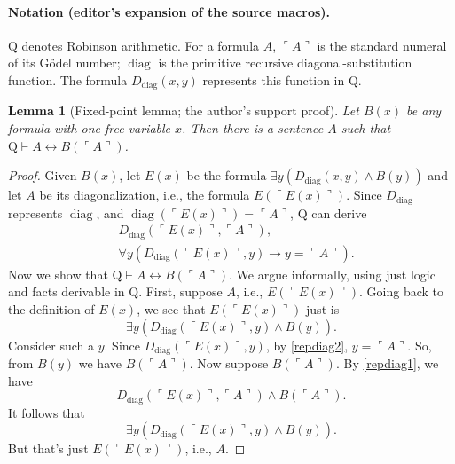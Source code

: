 \documentclass[UTF8,11pt]{ctexart}
\newtheorem*{lemma}{Lemma}
\theoremstyle{definition}
\begin{document}
\paragraph{Notation (editor's expansion of the source macros).}
$\mathrm Q$ denotes Robinson arithmetic. For a formula $A$, $\ulcorner A\urcorner$ is the standard numeral of its G\"odel number; $\operatorname{diag}$ is the primitive recursive diagonal-substitution function. The formula $D_{\operatorname{diag}}(x,y)$ represents this function in $\mathrm Q$.
\begin{lemma}[Fixed-point lemma; the author's support proof]
Let $B(x)$ be any formula with one free variable $x$. Then there is a sentence $A$ such that $\mathrm Q\vdash A\leftrightarrow B(\ulcorner A\urcorner)$.
\end{lemma}
\begin{proof}
Given $B(x)$, let $E(x)$ be the formula $\exists y(D_{\operatorname{diag}}(x,y)\land B(y))$ and let $A$ be its diagonalization, i.e., the formula $E(\ulcorner E(x)\urcorner)$.
Since $D_{\operatorname{diag}}$ represents $\operatorname{diag}$, and $\operatorname{diag}(\ulcorner E(x)\urcorner)=\ulcorner A\urcorner$, $\mathrm Q$ can derive
\begin{align}
&D_{\operatorname{diag}}(\ulcorner E(x)\urcorner,\ulcorner A\urcorner),\label{repdiag1}\\
&\forall y(D_{\operatorname{diag}}(\ulcorner E(x)\urcorner,y)\to y=\ulcorner A\urcorner).\label{repdiag2}
\end{align}
Now we show that $\mathrm Q\vdash A\leftrightarrow B(\ulcorner A\urcorner)$. We argue informally, using just logic and facts derivable in $\mathrm Q$.
First, suppose $A$, i.e., $E(\ulcorner E(x)\urcorner)$. Going back to the definition of $E(x)$, we see that $E(\ulcorner E(x)\urcorner)$ just is
\[\exists y(D_{\operatorname{diag}}(\ulcorner E(x)\urcorner,y)\land B(y)).\]
Consider such a $y$. Since $D_{\operatorname{diag}}(\ulcorner E(x)\urcorner,y)$, by \eqref{repdiag2}, $y=\ulcorner A\urcorner$. So, from $B(y)$ we have $B(\ulcorner A\urcorner)$.
Now suppose $B(\ulcorner A\urcorner)$. By \eqref{repdiag1}, we have
\[D_{\operatorname{diag}}(\ulcorner E(x)\urcorner,\ulcorner A\urcorner)\land B(\ulcorner A\urcorner).\]
It follows that
\[\exists y(D_{\operatorname{diag}}(\ulcorner E(x)\urcorner,y)\land B(y)).\]
But that's just $E(\ulcorner E(x)\urcorner)$, i.e., $A$.
\end{proof}
\end{document}
